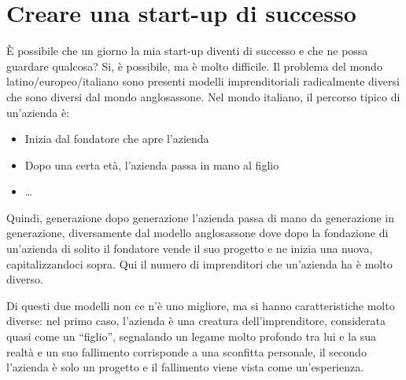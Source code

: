 \section{Creare una start-up di successo}

È possibile che un giorno la mia start-up diventi di successo e che ne possa
guardare qualcosa? Si, è possibile, ma è molto difficile.
Il problema del mondo latino/europeo/italiano sono presenti modelli
imprenditoriali radicalmente diversi che sono diversi dal mondo anglosassone.
Nel mondo italiano, il percorso tipico di un'azienda è:
\begin{itemize}
 \item Inizia dal fondatore che apre l'azienda
 \item Dopo una certa età, l'azienda passa in mano al figlio
 \item \dots
\end{itemize}
Quindi, generazione dopo generazione l'azienda passa di mano da generazione in
generazione, diversamente dal modello anglosassone dove dopo la fondazione di
un'azienda di solito il fondatore vende il suo progetto e ne inizia una nuova,
capitalizzandoci sopra. Qui il numero di imprenditori che un'azienda ha è molto
diverso.

Di questi due modelli non ce n'è uno migliore, ma si hanno caratteristiche
molto diverse: nel primo caso, l'azienda è una creatura dell'imprenditore,
considerata quasi come un ``figlio'', segnalando un legame molto profondo tra
lui e la sua realtà e un suo fallimento corrisponde a una sconfitta personale,
il secondo l'azienda è solo un progetto e il fallimento viene vista come
un'esperienza.

